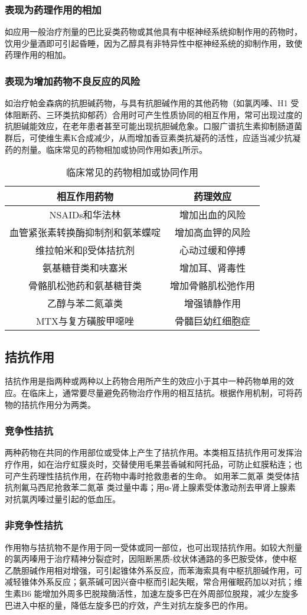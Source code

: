 \subsubsection{表现为药理作用的相加}

如应用一般治疗剂量的巴比妥类药物或其他具有中枢神经系统抑制作用的药物时，饮用少量酒即可引起昏睡，因为乙醇具有非特异性中枢神经系统的抑制作用，致使药理作用的相加。

\subsubsection{表现为增加药物不良反应的风险}

如治疗帕金森病的抗胆碱药物，与具有抗胆碱作用的其他药物（如氯丙嗪、H{1}
受体阻断药、三环类抗抑郁药）合用时可产生性质协同的相互作用，常可出现过度的抗胆碱能效应，在老年患者甚至可能出现抗胆碱危象。口服广谱抗生素抑制肠道菌群后，可使维生素K合成减少，从而增加香豆素类抗凝药的活性，应适当减少抗凝药的剂量。临床常见的药物相加或协同作用如表\ref{tab4-4}所示。

\begin{longtable}{cc}
    \caption{临床常见的药物相加或协同作用}
    \label{tab4-4}\\
\toprule
\endhead
相互作用药物 & 药理效应\tabularnewline
\midrule
NSAIDs和华法林 & 增加出血的风险\tabularnewline
血管紧张素转换酶抑制剂和氨苯蝶啶 & 增加高血钾的风险\tabularnewline
维拉帕米和β受体拮抗剂 & 心动过缓和停搏\tabularnewline
氨基糖苷类和呋塞米 & 增加耳、肾毒性\tabularnewline
骨骼肌松弛药和氨基糖苷类 & 增加骨骼肌松弛作用\tabularnewline
乙醇与苯二氮䓬类 &
增强镇静作用\tabularnewline
MTX与复方磺胺甲噁唑 & 骨髓巨幼红细胞症\tabularnewline
\bottomrule
\end{longtable}

\subsection{拮抗作用}

拮抗作用是指两种或两种以上药物合用所产生的效应小于其中一种药物单用的效应。在临床上，通常要尽量避免药物治疗作用的相互拮抗。根据作用机制，可将药物的拮抗作用分为两类。

\subsubsection{竞争性拮抗}

两种药物在共同的作用部位或受体上产生了拮抗作用。本类相互拮抗作用可发挥治疗作用，如在治疗虹膜炎时，交替使用毛果芸香碱和阿托品，可防止虹膜粘连；也可产生药理性拮抗作用，在药物中毒时抢救患者的生命。
如用苯二氮䓬
类受体拮抗剂氟马西尼抢救苯二氮䓬
类过量中毒；用α-肾上腺素受体激动剂去甲肾上腺素对抗氯丙嗪过量引起的低血压。

\subsubsection{非竞争性拮抗}

作用物与拮抗物不是作用于同一受体或同一部位，也可出现拮抗作用。如较大剂量的氯丙嗪用于治疗精神分裂症时，因阻断黑质-纹状体通路的多巴胺受体，使中枢乙酰胆碱作用相对增强，可引起锥体外系反应，而苯海索具有中枢抗胆碱作用，可减轻锥体外系反应；氨茶碱可因兴奋中枢而引起失眠，常合用催眠药加以对抗；维生素B{6}
能增加外周多巴脱羧酶活性，加速左旋多巴在外周部位脱羧，减少左旋多巴进入中枢的量，降低左旋多巴的疗效，产生对抗左旋多巴的作用。

